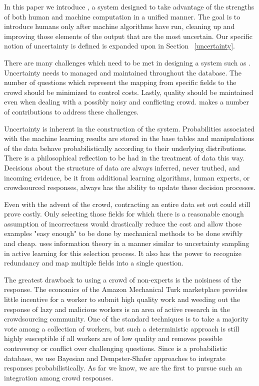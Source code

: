 In this paper we introduce \sysName, a system designed to take advantage of the strengths of both human and machine computation in a unified manner.  The goal is to introduce humans only after machine algorithms have run, cleaning up and improving those elements of the output that are the most uncertain.  Our specific notion of uncertainty is defined is expanded upon in Section ~\ref{uncertainty}.

There are many challenges which need to be met in designing a system such as \sysName .  Uncertainty needs to managed and maintained throughout the database.  The number of questions which represent the mapping from specific fields to the crowd should be minimized to control costs.  Lastly, quality should be maintained even when dealing with a possibly noisy and conflicting crowd.  \sysName makes a number of contributions to address these challenges.

Uncertainty is inherent in the construction of the system.  Probabilities associated with the machine learning results are stored in the base tables and manipulations of the data behave probabilistically according to their underlying distributions.  There is a philosophical reflection to be had in the treatment of data this way.  Decisions about the structure of data are always inferred, never truthed, and incoming evidence, be it from additional learning algorithms, human experts, or crowdsourced responses, always has the ability to update these decision processes.

Even with the advent of the crowd, contracting an entire data set out could still prove costly.  Only selecting those fields for which there is a reasonable enough assumption of incorrectness would drastically reduce the cost and allow those examples "easy enough" to be done by mechanical methods to be done swiftly and cheap.  \sysName uses information theory in a manner similar to uncertainty sampling in active learning for this selection process.  It also has the power to recognize redundancy and map multiple fields into a single question.

The greatest drawback to using a crowd of non-experts is the noisiness of the response.  The economics of the Amazon Mechanical Turk marketplace provides little incentive for a worker to submit high quality work and weeding out the response of lazy and malicious workers is an area of active research in the crowdsourcing community.  One of the standard techniques is to take a majority vote among a collection of workers, but such a deterministic approach is still highly susceptible if all workers are of low quality and removes possible controversy or conflict over challenging questions.  Since \sysName is a probabilistic database, we use Bayesian and Dempster-Shafer approaches to integrate responses probabilistically.  As far we know, we are the first to pursue such an integration among crowd responses.   

